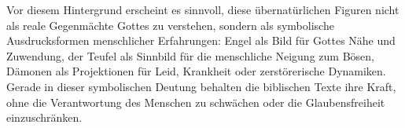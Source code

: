 Vor diesem Hintergrund erscheint es sinnvoll, diese übernatürlichen Figuren nicht als reale Gegenmächte Gottes zu verstehen, sondern als symbolische Ausdrucksformen menschlicher Erfahrungen: Engel als Bild für Gottes Nähe und Zuwendung, der Teufel als Sinnbild für die menschliche Neigung zum Bösen, Dämonen als Projektionen für Leid, Krankheit oder zerstörerische Dynamiken. Gerade in dieser symbolischen Deutung behalten die biblischen Texte ihre Kraft, ohne die Verantwortung des Menschen zu schwächen oder die Glaubensfreiheit einzuschränken.\\
